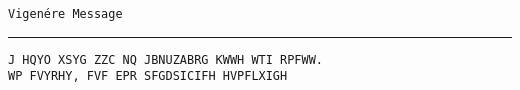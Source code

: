 
\begin{minipage}{\textwidth}
\begin{center} {\tt Vigen\'ere Message} \end{center}
\hrule
\begin{center}
\Large
\begin{verbatim}
J HQYO XSYG ZZC NQ JBNUZABRG KWWH WTI RPFWW.
WP FVYRHY, FVF EPR SFGDSICIFH HVPFLXIGH
\end{verbatim}
\end{center}
\end{minipage}
